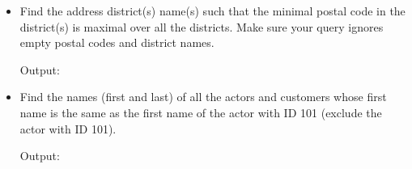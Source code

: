 \documentclass{assignment}
\begin{document}
\begin{itemize}[noitemsep]
        lastline=85]{assets/review.sql}
        Alternate approach using \texttt{CREATE VIEW}
        
        Output:
        
    \item Find the address district(s) name(s) such that the minimal
        postal code in the district(s) is maximal over all the districts.
        Make sure your query ignores empty postal codes and district
        names.
        
        Output:
        
    \item Find the names (first and last) of all the actors and customers
        whose first name is the same as the first name of the actor
        with ID 101 (exclude the actor with ID 101).
        
        Output:
        
\end{itemize}
\end{document}
